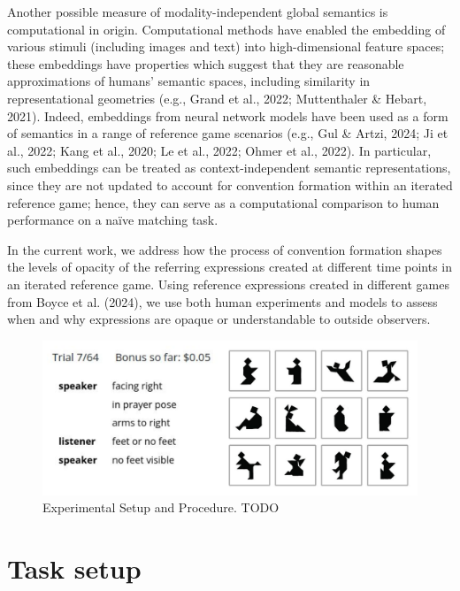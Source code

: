 \documentclass[10pt, letterpaper]{article}
\begin{document}
Another possible measure of modality-independent global semantics is
computational in origin. Computational methods have enabled the
embedding of various stimuli (including images and text) into
high-dimensional feature spaces; these embeddings have properties which
suggest that they are reasonable approximations of humans' semantic
spaces, including similarity in representational geometries (e.g., Grand
et al., 2022; Muttenthaler \& Hebart, 2021). Indeed, embeddings from
neural network models have been used as a form of semantics in a range
of reference game scenarios (e.g., Gul \& Artzi, 2024; Ji et al., 2022;
Kang et al., 2020; Le et al., 2022; Ohmer et al., 2022). In particular,
such embeddings can be treated as context-independent semantic
representations, since they are not updated to account for convention
formation within an iterated reference game; hence, they can serve as a
computational comparison to human performance on a naïve matching task.

In the current work, we address how the process of convention formation
shapes the levels of opacity of the referring expressions created at
different time points in an iterated reference game. Using reference
expressions created in different games from Boyce et al. (2024), we use
both human experiments and models to assess when and why expressions are
opaque or understandable to outside observers.

\begin{CodeChunk}
\begin{figure}[t!]

{\centering \includegraphics[width=1\linewidth]{matcher-diagram} 

}

\caption[Experimental Setup and Procedure]{Experimental Setup and Procedure. TODO \label{game}}\label{fig:interface}
\end{figure}
\end{CodeChunk}

\section{Task setup}\label{task-setup}
\end{document}
